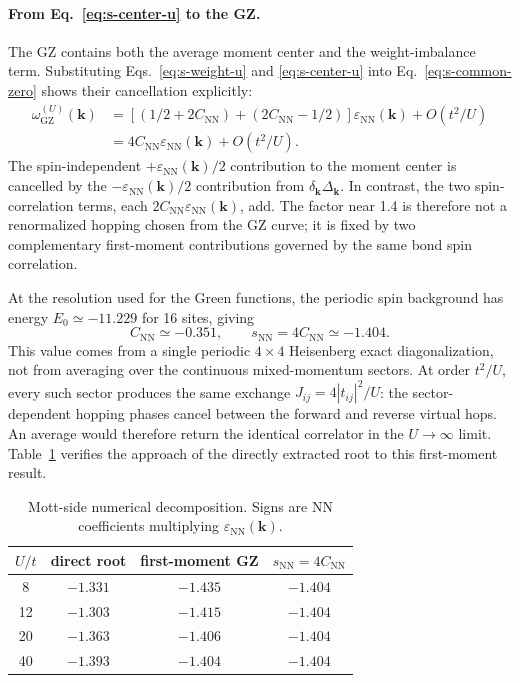 \documentclass[10pt]{article}
\newcommand{\epsk}{\varepsilon_{\mathrm{NN}}(\mathbf{k})}
\newcommand{\wzero}{\omega_{\mathrm{GZ}}}
\newcommand{\Cnn}{C_{\mathrm{NN}}}
\newcommand{\dk}{\delta_{\mathbf{k}}}
\newcommand{\sep}{\Delta_{\mathbf{k}}}
\begin{document}
\paragraph{From Eq.~\ref{eq:s-center-u} to the GZ.}
The GZ contains both the average moment center and the
weight-imbalance term. Substituting Eqs.~\ref{eq:s-weight-u} and
\ref{eq:s-center-u} into Eq.~\ref{eq:s-common-zero} shows their
cancellation explicitly:
\begin{equation}
\boxed{
\begin{aligned}
\wzero^{(U)}(\mathbf{k})
&=\left[(1/2+2\Cnn)+(2\Cnn-1/2)\right]\epsk+O(t^2/U)\\
&=4\Cnn\epsk+O(t^2/U).
\end{aligned}}
\label{eq:s-u-result}
\end{equation}
The spin-independent $+\epsk/2$ contribution to the moment center is
cancelled by the $-\epsk/2$ contribution from $\dk\sep$. In contrast, the
two spin-correlation terms, each $2\Cnn\epsk$, add. The factor near 1.4 is
therefore not a renormalized hopping chosen from the GZ curve; it is fixed
by two complementary first-moment contributions governed by the same bond
spin correlation.

At the resolution used for the Green functions, the periodic spin background has energy $E_0\simeq-11.229$ for 16 sites, giving
\begin{equation}
\Cnn\simeq-0.351,\qquad s_{\mathrm{NN}}=4\Cnn\simeq-1.404.
\label{eq:s-cnn-resolution}
\end{equation}
This value comes from a single periodic $4\times4$ Heisenberg exact
diagonalization, not from averaging over the continuous mixed-momentum
sectors.  At order $t^2/U$, every such sector produces the same exchange
$J_{ij}=4|t_{ij}|^2/U$: the sector-dependent hopping phases cancel between
the forward and reverse virtual hops.  An average would therefore return
the identical correlator in the $U\to\infty$ limit.
Table~\ref{tab:u-decomposition} verifies the approach of the directly extracted root to this first-moment result.

\begin{table}[H]
\centering
\caption{Mott-side numerical decomposition. Signs are NN coefficients multiplying $\epsk$.}
\label{tab:u-decomposition}
\begin{tabular}{cccc}
\toprule
$U/t$ & direct root & first-moment GZ & $s_{\mathrm{NN}}=4\Cnn$ \\
\midrule
8  & $-1.331$ & $-1.435$ & $-1.404$ \\
12 & $-1.303$ & $-1.415$ & $-1.404$ \\
20 & $-1.363$ & $-1.406$ & $-1.404$ \\
40 & $-1.393$ & $-1.404$ & $-1.404$ \\
\bottomrule
\end{tabular}
\end{table}
\end{document}
